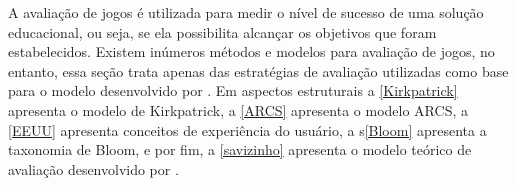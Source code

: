 








A avaliação de jogos é utilizada para medir o nível de sucesso de uma solução educacional, ou seja, se ela possibilita alcançar os objetivos que foram estabelecidos. Existem inúmeros métodos e modelos para avaliação de jogos, no entanto, essa seção trata apenas das estratégias de avaliação utilizadas como base para o modelo desenvolvido por . Em aspectos estruturais a \autoref{Kirkpatrick} apresenta o modelo de Kirkpatrick, a \autoref{ARCS} apresenta o modelo \ac{ARCS}, a \autoref{EEUU} apresenta conceitos de experiência do usuário, a s\autoref{Bloom} apresenta a taxonomia de Bloom, e por fim, a \autoref{savizinho} apresenta o modelo teórico de avaliação desenvolvido por .


